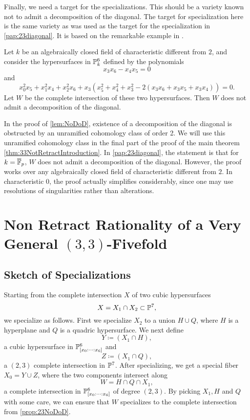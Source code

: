 Finally, we need a target for the specializations. This should be a variety known not to admit a decomposition of the diagonal. The target for specialization here is the same variety as was used as the target for the specialization in \cref{pap:23diagonal}. It is based on the remarkable example in \cite{HPTActa}.

\begin{proposition}
	\label{prop:23NoDoD}
	Let $k$ be an algebraically closed field of characteristic different from $2$, and consider the hypersurfaces in $\P^6_k$ defined by the polynomials
	\[x_3x_6-x_4x_5 = 0\]
	and
	\[x_0^2x_5 + x_1^2x_4 + x_2^2x_6 + x_3\left(x_5^2+x_4^2+x_3^2 -2(x_3x_6 + x_3x_5 + x_3x_4)\right) = 0.\]
	Let $W$ be the complete intersection of these two hypersurfaces. Then $W$ does not admit a decomposition of the diagonal.
\end{proposition}
\begin{remark}
	\label{rem:ChangesFrom23Result}
	 In the proof of \cref{lem:NoDoD}, existence of a decomposition of the diagonal is obstructed by an unramified cohomology class of order 2. We will use this unramified cohomology class in the final part of the proof of the main theorem \cref{thm:33NotRetractIntroduction}.
	 In \cref{pap:23diagonal}, the statement is that for $k = \overline{\F}_p$, $W$ does not admit a decomposition of the diagonal. However, the proof works over any algebraically closed field of characteristic different from $2$. In characteristic $0$, the proof actually simplifies considerably, since one may use resolutions of singularities rather than alterations.
\end{remark}



\section{Non Retract Rationality of a Very General $(3,3)$-Fivefold}
\label{sec:33specialization}

\subsection{Sketch of Specializations}
Starting from the complete intersection $X$ of two cubic hypersurfaces 
\[X = X_1 \cap X_2 \subset \P^7,\]
we specialize as follows. First we specialize $X_2$ to a union $H \cup Q$, where $H$ is a hyperplane and $Q$ is a quadric hypersurface. We next define 
\[Y \coloneqq (X_1 \cap H),\]
a cubic hypersurface in $\P^6_{[x_0:\dots:x_6]}$ and
\[Z \coloneqq (X_1 \cap Q),\]
a $(2,3)$ complete intersection in $\P^7$.
After specializing, we get a special fiber $X_0 = Y \cup Z$, where the two components intersect along \[W = H \cap Q \cap X_1,\]
a complete intersection in $\P^6_{[x_0:\dots:x_6]}$ of degree $(2,3)$. By picking $X_1,H$ and $Q$ with some care, we can ensure that $W$ specializes to the complete intersection from \cref{prop:23NoDoD}.

